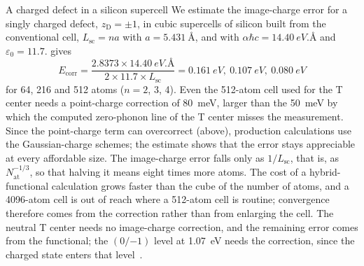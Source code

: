 \begin{workedexample}{A charged defect in a silicon supercell}\label{we:E-sidefect}
We estimate the image-charge error for a singly charged defect, $z_{\mathrm{D}} = \pm1$, in cubic supercells of silicon built from the conventional cell, $L_{\mathrm{sc}} = na$ with $a = \SI{5.431}{\angstrom}$, and with $\alpha\hbar c = \SI{14.40}{eV.\angstrom}$ and $\varepsilon_0 = 11.7$.  gives
\begin{equation*}
  E_{\mathrm{corr}} = \frac{2.8373\times\SI{14.40}{eV.\angstrom}}{2\times11.7\times L_{\mathrm{sc}}}
  = \SI{0.161}{eV},\ \SI{0.107}{eV},\ \SI{0.080}{eV}
\end{equation*}
for 64, 216 and 512 atoms ($n = 2$, 3, 4). Even the 512-atom cell used for the T center needs a point-charge correction of \SI{80}{meV}, larger than the \SI{50}{meV} by which the computed zero-phonon line of the T center misses the measurement. Since the point-charge term can overcorrect (above), production calculations use the Gaussian-charge schemes; the estimate shows that the error stays appreciable at every affordable size. The image-charge error falls only as $1/L_{\mathrm{sc}}$, that is, as $N_{\mathrm{at}}^{-1/3}$, so that halving it means eight times more atoms. The cost of a hybrid-functional calculation grows faster than the cube of the number of atoms, and a 4096-atom cell is out of reach where a 512-atom cell is routine; convergence therefore comes from the correction rather than from enlarging the cell. The neutral T center needs no image-charge correction, and the remaining error comes from the functional; the $(0/{-1})$ level at \SI{1.07}{eV} needs the correction, since the charged state enters that level~\cite{dhaliah2022first}.
\end{workedexample}

